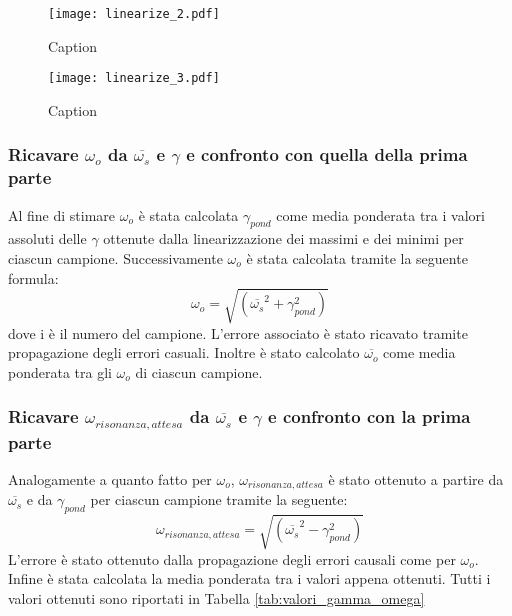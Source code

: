 \documentclass[a4paper,11pt,oneside]{article}
\begin{document}
\begin{figure}[h!]
    \centering
    \texttt{[image: linearize\_2.pdf]}
    \caption{Caption}
    \label{fig:my_label}
\end{figure}

\begin{figure}[h!]
    \centering
    \texttt{[image: linearize\_3.pdf]}
    \caption{Caption}
    \label{fig:my_label}
\end{figure}

\subsubsection{Ricavare $\omega_o$ da $\overline{\omega_s}$ e $\gamma$ e confronto con quella della prima parte}
Al fine di stimare $\omega_o$ è stata calcolata $\gamma_{pond}$ come media ponderata tra i valori assoluti delle $\gamma$ ottenute dalla linearizzazione dei massimi e dei minimi per ciascun campione. Successivamente $\omega_o$ è stata calcolata tramite la seguente formula:
\begin{equation*}
    \omega_{o} = \sqrt{(\overline{\omega_{s}}^2+\gamma_{pond}^2)}
\end{equation*}
dove i è il numero del campione.
L'errore associato è stato ricavato tramite propagazione degli errori casuali.
Inoltre è stato calcolato $\overline{\omega_o}$ come media ponderata tra gli $\omega_o$ di ciascun campione.

\subsubsection{Ricavare $\omega_{risonanza, attesa}$ da $\overline{\omega_s}$ e $\gamma$ e confronto con la prima parte}
Analogamente a quanto fatto per $\omega_o$, $\omega_{risonanza,attesa}$ è stato ottenuto a partire da $\overline{\omega_s}$ e da $\gamma_{pond}$ per ciascun campione tramite la seguente: 
\begin{equation*}
    \omega_{risonanza,attesa} = \sqrt{(\overline{\omega_{s}}^2-\gamma_{pond}^2)}
\end{equation*}
L'errore è stato ottenuto dalla propagazione degli errori causali come per $\omega_o$. 
Infine è stata calcolata la media ponderata tra i valori appena ottenuti. Tutti i valori ottenuti sono riportati in Tabella \ref{tab:valori_gamma_omega}
\end{document}
